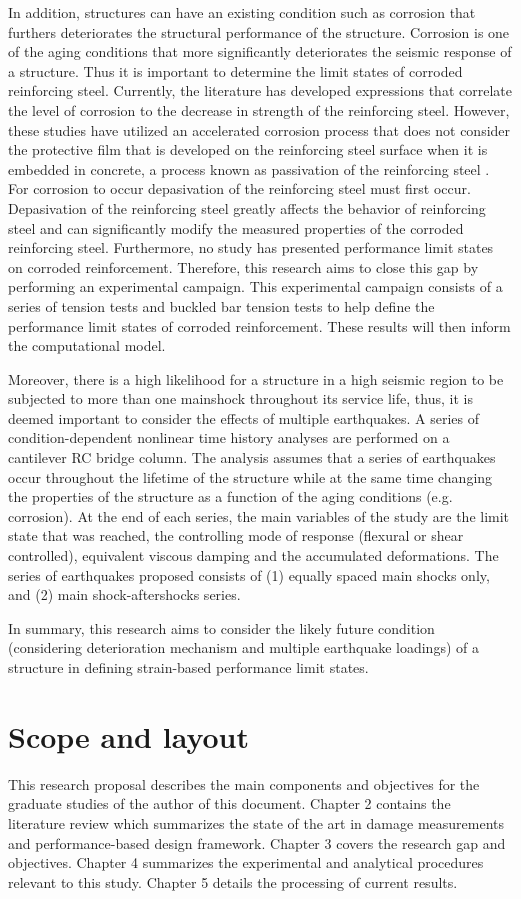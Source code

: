 In addition, structures can have an existing condition such as corrosion that furthers deteriorates the structural performance of the structure. Corrosion is one of the aging conditions that more significantly deteriorates the seismic response of a structure. Thus it is important to determine the limit states of corroded reinforcing steel. Currently, the literature has developed expressions that correlate the level of corrosion to the decrease in strength of the reinforcing steel\cite{Yuan2017a}\cite{Du2005}. However, these studies have utilized an accelerated corrosion process that does not consider the protective film that is developed on the reinforcing steel surface when it is embedded in concrete, a process known as passivation of the reinforcing steel \cite{Mehta2014}\cite{Ghods2009}. For corrosion to occur depasivation of the reinforcing steel must first occur. Depasivation of the reinforcing steel greatly affects the behavior of reinforcing steel and can significantly modify the measured properties of the corroded reinforcing steel. Furthermore, no study has presented performance limit states on corroded reinforcement. Therefore, this research aims to close this gap by performing an experimental campaign. This experimental campaign consists of a series of tension tests and buckled bar tension tests to help define the performance limit states of corroded reinforcement. These results will then inform the computational model.

Moreover, there is a high likelihood for a structure in a high seismic region to be subjected to more than one mainshock throughout its service life, thus, it is deemed important to consider the effects of multiple earthquakes. A series of condition-dependent nonlinear time history analyses are performed on a cantilever RC bridge column. The analysis assumes that a series of earthquakes occur throughout the lifetime of the structure while at the same time changing the properties of the structure as a function of the aging conditions (e.g. corrosion). At the end of each series, the main variables of the study are the limit state that was reached, the controlling mode of response (flexural or shear controlled), equivalent viscous damping and the accumulated deformations. The series of earthquakes proposed consists of (1) equally spaced main shocks only, and (2) main shock-aftershocks series.

In summary, this research aims to consider the likely future condition (considering deterioration mechanism and multiple earthquake loadings) of a structure in defining strain-based performance limit states.

\section{Scope and layout}
This research proposal describes the main components and objectives for the graduate studies of the author of this document. Chapter 2 contains the literature review which summarizes the state of the art in damage measurements and performance-based design framework. Chapter 3 covers the research gap and objectives. Chapter 4 summarizes the experimental and analytical procedures relevant to this study. Chapter 5 details the processing of current results. 